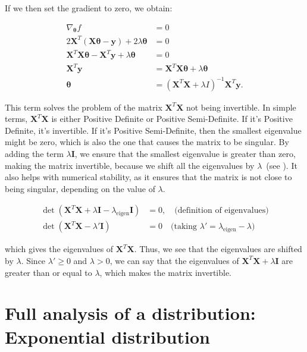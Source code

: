\documentclass[12pt,a4paper,oneside]{paper}
\begin{document}
If we then set the gradient to zero, we obtain:

\begin{align*}
\nabla_{\bm{\theta}} f &= 0 \\
2 \bm{X}^T (\bm{X} \bm{\theta} - \bm{y}) + 2 \lambda \bm{\theta} &= 0 \\
\bm{X}^T \bm{X} \bm{\theta} - \bm{X}^T \bm{y} + \lambda \bm{\theta} &= 0 \\
\bm{X}^T \bm{y} &= \bm{X}^T \bm{X} \bm{\theta} + \lambda \bm{\theta} \\
\bm{\theta} &= (\bm{X}^T \bm{X} + \lambda I)^{-1} \bm{X}^T \bm{y}.
\end{align*}

This term solves the problem of the matrix \( \bm{X}^T \bm{X} \) not being invertible.
In simple terms, \( \bm{X}^T \bm{X} \) is either Positive Definite or Positive Semi-Definite. If it's Positive Definite, it's invertible.
If it's Positive Semi-Definite, then the smallest eigenvalue might be zero, which is also the one that causes the matrix to be singular.
By adding the term \( \lambda \bm{I} \), we ensure that the smallest eigenvalue is greater than zero, making the matrix invertible, because we shift all the eigenvalues by $\lambda$~(see ).
It also helps with numerical stability, as it ensures that the matrix is not close to being singular, depending on the value of \( \lambda \).
 
\begin{equation}
    \begin{aligned}
        \det(\bm{X}^T \bm{X} + \lambda \bm{I} - \lambda_{\text{eigen}} \bm{I}) &= 0, \quad \text{(definition of eigenvalues)} \\
        \det(\bm{X}^T \bm{X} - \lambda' \bm{I}) &= 0 \quad \text{(taking } \lambda' = \lambda_{\text{eigen}} - \lambda)
    \end{aligned}
    \label{eq:det}
\end{equation}
    
    which gives the eigenvalues of \(\bm{X}^T \bm{X}\).
    Thus, we see that the eigenvalues are shifted by \(\lambda\). Since \(\lambda' \geq 0\) and \(\lambda > 0\), we can say that the eigenvalues of \(\bm{X}^T \bm{X} + \lambda \bm{I}\) are greater than or equal to \(\lambda\), which makes the matrix invertible.


    \newpage
\section{Full analysis of a distribution: Exponential distribution}
\end{document}
